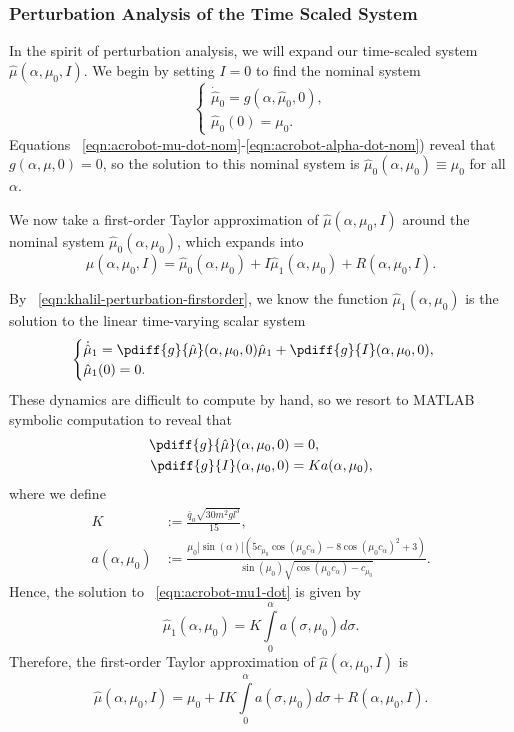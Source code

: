 \subsubsection*{Perturbation Analysis of the Time Scaled System}

In the spirit of perturbation analysis, we will expand our time-scaled system
\(\hat{\mu}(\alpha,\mu_0,I)\).
We begin by setting \(I = 0\) to find the nominal system
\[
\begin{cases}
    \dot{\hat{\mu}}_0 = g(\alpha,\hat{\mu}_0,0)
    , \\
    \hat{\mu}_0(0) = \mu_0
   .
\end{cases}
\]
Equations ~\eqref{eqn:acrobot-mu-dot-nom}-\eqref{eqn:acrobot-alpha-dot-nom})
reveal that \(g(\alpha,\mu,0) = 0\),
so the solution to this nominal system is 
\(\hat{\mu}_0(\alpha,\mu_0) \equiv \mu_0\) for all \(\alpha\).

We now take a first-order Taylor approximation of \(\hat{\mu}(\alpha,\mu_0,I)\)
around the nominal system \(\hat{\mu}_0(\alpha,\mu_0)\), which 
expands into 
\begin{equation}\label{eqn:acrobot-muhat-approx}
    \hat{\mu}(\alpha,\mu_0,I) = \hat{\mu}_0(\alpha,\mu_0) + I
    \hat{\mu}_1(\alpha,\mu_0)
    + R(\alpha,\mu_0,I)
    .
\end{equation}

By ~\eqref{eqn:khalil-perturbation-firstorder}, we know the function
\(\hat{\mu}_1(\alpha,\mu_0)\) is the solution to the linear time-varying scalar
system
\begin{equation}\label{eqn:acrobot-mu1-dot}
    \begin{cases}
        \dot{\hat{\mu}}_1 = 
        \pdiff{g}{\hat{\mu}}(\alpha,\mu_0,0)\hat{\mu}_1 + \pdiff{g}{I}(\alpha, \mu_0, 0)
        , \\
        \hat{\mu}_1(0) = 0
        .
    \end{cases}
\end{equation}
These dynamics are difficult to compute by hand, so we resort to MATLAB symbolic
computation to reveal that
\begin{align*}
    \pdiff{g}{\hat{\mu}}(\alpha,\mu_0,0) &= 0
    , \\
    \pdiff{g}{I}(\alpha, \mu_0, 0) &= K a(\alpha,\mu_0)
    ,
\end{align*}
where we define
\begin{align*}
    K &:= \frac{\bar{q}_a \sqrt{30m^2g l^3}}{15}
    , \\
    a(\alpha,\mu_0) &:= \frac{
        \mu_0 |\sin(\alpha)| \left(
        5 c_{\mu_0} \cos(\mu_0 c_\alpha) - 8 \cos(\mu_0c_\alpha)^2 + 3
    \right)
    }{
    \sin(\mu_0)\sqrt{\cos(\mu_0c_\alpha) - c_{\mu_0}}
    }
    .
\end{align*}
Hence, the solution to ~\eqref{eqn:acrobot-mu1-dot} is given by
\[
    \hat{\mu}_1(\alpha,\mu_0) =
    K \int \limits_0^\alpha a(\sigma,\mu_0)d\sigma
    .
\]
Therefore, the first-order Taylor approximation of \(\hat{\mu}(\alpha,\mu_0,I)\) is
\begin{equation}\label{eqn:acrobot-muhat-expanded}
    \hat{\mu}(\alpha,\mu_0,I)
    = \mu_0 + I K \int \limits_0^\alpha a(\sigma,\mu_0)d\sigma +
    R(\alpha,\mu_0,I)
    .
\end{equation}

